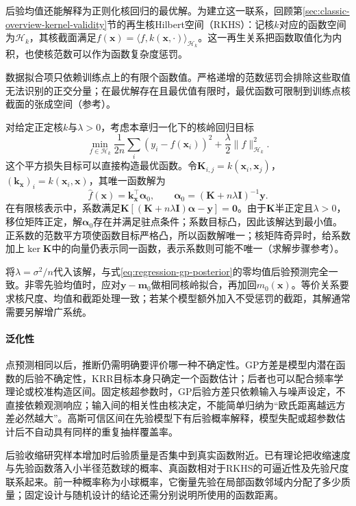 后验均值还能解释为正则化核回归的最优解。为建立这一联系，回顾第\ref{sec:classic-overview-kernel-validity}节的再生核Hilbert空间（RKHS）：记核$k$对应的函数空间为$\mathcal H_k$，其核截面满足$f(\bm{x})=\langle f,k(\bm{x},\cdot)\rangle_{\mathcal H_k}$。这一再生关系把函数取值化为内积，也使核范数可以作为函数复杂度惩罚。

数据拟合项只依赖训练点上的有限个函数值。严格递增的范数惩罚会排除这些取值无法识别的正交分量；在最优解存在且最优值有限时，最优函数可限制到训练点核截面的张成空间（参考）。

对给定正定核$k$与$\lambda>0$，考虑本章归一化下的核岭回归目标
\[
 \min_{f\in\mathcal H_k}
 \frac1{2n}\sum_i(y_i-f(\bm x_i))^2
 +\frac{\lambda}{2}\lVert f\rVert_{\mathcal H_k}^2.
\]
这个平方损失目标可以直接构造最优函数。令$\bm K_{i,j}=k(\bm x_i,\bm x_j)$，$(\bm k_{\bm x})_i=k(\bm x_i,\bm x)$，其唯一函数解为
\[
 \widehat f(\bm x)=\bm k_{\bm x}^\top\bm\alpha_0,\qquad
 \bm\alpha_0=(\bm K+n\lambda\bm I)^{-1}\bm y.
\]
在有限核表示中，系数满足$\bm K[(\bm K+n\lambda\bm I)\bm\alpha-\bm y]=\bm0$。由于$\bm K$半正定且$\lambda>0$，移位矩阵正定，解$\bm\alpha_0$存在并满足驻点条件；系数目标凸，因此该解达到最小值。正系数的范数平方项使函数目标严格凸，所以函数解唯一；核矩阵奇异时，给系数加上$\ker\bm K$中的向量仍表示同一函数，表示系数则可能不唯一（求解步骤参考）。

将$\lambda=\sigma^2/n$代入该解，与式\eqref{eq:regression-gp-posterior}的零均值后验预测完全一致。非零先验均值时，应对$\bm{y}-\bm{m}_0$做相同核岭拟合，再加回$m_0(\bm{x})$。等价关系要求核尺度、均值和截距处理一致；若某个模型额外加入不受惩罚的截距，其解通常需要另解增广系统。

\paragraph{泛化性}
点预测相同以后，推断仍需明确要评价哪一种不确定性。GP方差是模型内潜在函数的后验不确定性，KRR目标本身只确定一个函数估计；后者也可以配合频率学理论或校准构造区间。固定核超参数时，GP后验方差只依赖输入与噪声设定，不直接依赖观测响应；输入间的相关性由核决定，不能简单归纳为“欧氏距离越远方差必然越大”。高斯可信区间在先验模型下有后验概率解释，模型失配或超参数估计后不自动具有同样的重复抽样覆盖率。

后验收缩研究样本增加时后验质量是否集中到真实函数附近。已有理论把收缩速度与先验函数落入小半径范数球的概率、真函数相对于RKHS的可逼近性及先验尺度联系起来。前一种概率称为小球概率，它衡量先验在局部函数邻域内分配了多少质量；固定设计与随机设计的结论还需分别说明所使用的函数距离。

